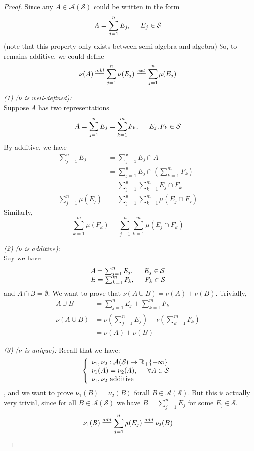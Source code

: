 \begin{proof}
  Since any $A\in\mathcal{A}(\mathcal{S})$ could be written in the form
  \[A = \sum_{j=1}^n E_j, \hspace{0.5cm} E_j\in\mathcal{S}\]
  (note that this property only exists between semi-algebra and algebra)
  So, to remains additive, we could define
  \[\nu(A) \overset{add}{=\joinrel=} \sum_{j=1}^n \nu(E_j) \overset{ext}{=\joinrel=} \sum_{j=1}^n \mu(E_j)\]

  \emph{(1) ($\nu$ is well-defined):} \\
  Suppose $A$ has two representations
  \[A = \sum_{j=1}^n E_j = \sum_{k=1}^m F_k, \hspace{0.5cm} E_j, F_k \in\mathcal{S}\]
  By additive, we have
  \begin{align*}
    \sum_{j=1}^n E_j &= \sum_{j=1}^n E_j \cap A \\
    &= \sum_{j=1}^n E_j \cap (\sum_{k=1}^m F_k) \\
    &= \sum_{j=1}^n\sum_{k=1}^m E_j\cap F_k \\
    \sum_{j=1}^n \mu(E_j) &= \sum_{j=1}^n\sum_{k=1}^m \mu(E_j\cap F_k)
  \end{align*}
  Similarly,
  \[\sum_{k=1}^m \mu(F_k) = \sum_{j=1}^n\sum_{k=1}^m \mu(E_j\cap F_k)\]

  \emph{(2) ($\nu$ is additive):} \\
  Say we have \[
    \begin{array}{l}
      A = \sum_{j=1}^n E_j, \hspace{0.5cm} E_j\in \mathcal{S} \\
      B = \sum_{k=1}^m F_k, \hspace{0.5cm} F_k\in \mathcal{S}
    \end{array}
  \]
  and $A\cap B = \emptyset$.
  We want to prove that $\nu(A\cup B) = \nu(A) + \nu(B)$.
  Trivially,
  \begin{align*}
    A \cup B &= \sum_{j=1}^n E_j + \sum_{k=1}^m F_k \\
    \nu(A\cup B) &= \nu(\sum_{j=1}^nE_j) + \nu(\sum_{k=1}^m F_k) \\
    &= \nu(A) + \nu(B)
  \end{align*}
  
  \emph{(3) ($\nu$ is unique):}
  Recall that we have: \[
    \left\{
      \begin{array}{l}
        \nu_1, \nu_2 : \mathcal{A}(\mathcal{S}) \to \mathbb{R}_+\{+\infty\} \\
        \nu_1(A) = \nu_2(A), \hspace{0.5cm} \forall A \in \mathcal{S} \\
        \nu_1, \nu_2 \mbox{ additive}
      \end{array}
    \right.
  \], and we want to prove $\nu_1(B) = \nu_2(B)$ forall $B\in\mathcal{A}(\mathcal{S})$.
  But this is actually very trivial, since for all $B\in\mathcal{A}(\mathcal{S})$ we have $B = \sum_{j=1}^n E_j$ for some $E_j\in\mathcal{S}$.
  \[\nu_1(B) \overset{add}{=\joinrel=} \sum_{j=1}^n \mu(E_j) \overset{add}{=\joinrel=} \nu_2(B)\]
\end{proof}


